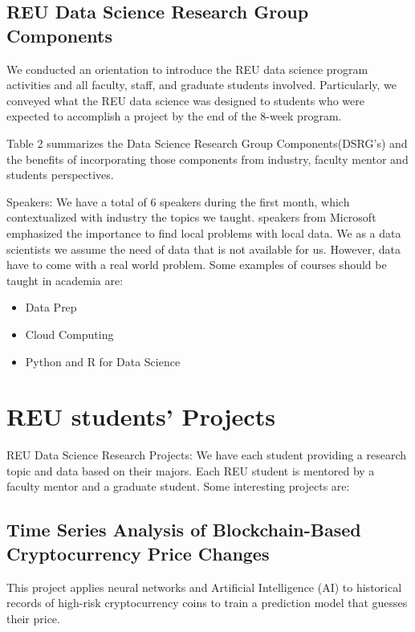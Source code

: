 \documentclass[10pt, a4paper, twocolumn]{article} %
\begin{document}
\subsection{REU Data Science Research Group Components}

We conducted an orientation to introduce the REU data science program activities and all faculty, staff, and graduate students involved.
Particularly, we conveyed what the REU data science was designed to students who were expected to accomplish a project by the end of the 8-week program.

Table 2 summarizes the Data Science Research Group Components(DSRG's) and the benefits of incorporating those components from industry, faculty mentor and students perspectives.


Speakers: We have a total of 6 speakers during the first month, which contextualized with industry the topics we taught. speakers from Microsoft emphasized the importance to find local problems with local data. We as a data scientists we assume the need of data that is not available for us. However, data have to come with a real world problem. Some examples of courses should be taught in academia are:

\begin{itemize}
	\item Data Prep 
	\item Cloud Computing 
	\item Python and R for Data Science
\end{itemize}


\section{REU students' Projects}

REU Data Science Research Projects: We have each student providing a research topic and data based on their majors. Each REU student is mentored by a faculty mentor and a graduate student. Some interesting projects are:


\subsection{Time Series Analysis of Blockchain-Based Cryptocurrency Price Changes}
This project applies neural networks and Artificial Intelligence (AI) to historical records of high-risk cryptocurrency coins to train a prediction model that guesses their price.  
\end{document}
